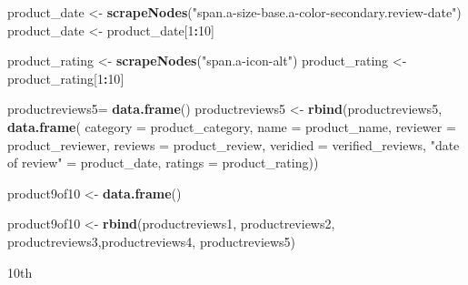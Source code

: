 \documentclass[
]{article}
\newenvironment{Shaded}{\begin{snugshade}}{\end{snugshade}}
\newcommand{\AttributeTok}[1]{\textcolor[rgb]{0.13,0.29,0.53}{#1}}
\newcommand{\DecValTok}[1]{\textcolor[rgb]{0.00,0.00,0.81}{#1}}
\newcommand{\FunctionTok}[1]{\textcolor[rgb]{0.13,0.29,0.53}{\textbf{#1}}}
\newcommand{\NormalTok}[1]{#1}
\newcommand{\OtherTok}[1]{\textcolor[rgb]{0.56,0.35,0.01}{#1}}
\newcommand{\SpecialCharTok}[1]{\textcolor[rgb]{0.81,0.36,0.00}{\textbf{#1}}}
\newcommand{\StringTok}[1]{\textcolor[rgb]{0.31,0.60,0.02}{#1}}
\begin{document}
\begin{Shaded}
\begin{Highlighting}[]
\NormalTok{  product\_date }\OtherTok{\textless{}{-}} \FunctionTok{scrapeNodes}\NormalTok{(}\StringTok{"span.a{-}size{-}base.a{-}color{-}secondary.review{-}date"}\NormalTok{)}
\NormalTok{  product\_date }\OtherTok{\textless{}{-}}\NormalTok{ product\_date[}\DecValTok{1}\SpecialCharTok{:}\DecValTok{10}\NormalTok{]}
  
\NormalTok{  product\_rating }\OtherTok{\textless{}{-}} \FunctionTok{scrapeNodes}\NormalTok{(}\StringTok{"span.a{-}icon{-}alt"}\NormalTok{)}
\NormalTok{  product\_rating }\OtherTok{\textless{}{-}}\NormalTok{ product\_rating[}\DecValTok{1}\SpecialCharTok{:}\DecValTok{10}\NormalTok{]}
  
\NormalTok{  productreviews5}\OtherTok{=} \FunctionTok{data.frame}\NormalTok{()}
\NormalTok{  productreviews5 }\OtherTok{\textless{}{-}} \FunctionTok{rbind}\NormalTok{(productreviews5, }\FunctionTok{data.frame}\NormalTok{(}
                      \AttributeTok{category =}\NormalTok{ product\_category,}
                      \AttributeTok{name =}\NormalTok{ product\_name,}
                      \AttributeTok{reviewer =}\NormalTok{ product\_reviewer,}
                      \AttributeTok{reviews =}\NormalTok{ product\_review,}
                      \AttributeTok{veridied =}\NormalTok{ verified\_reviews,}
                      \StringTok{"date of review"} \OtherTok{=}\NormalTok{ product\_date,}
                      \AttributeTok{ratings =}\NormalTok{ product\_rating))}
  
  
\NormalTok{  product9of10 }\OtherTok{\textless{}{-}} \FunctionTok{data.frame}\NormalTok{()}
  
\NormalTok{  product9of10 }\OtherTok{\textless{}{-}} \FunctionTok{rbind}\NormalTok{(productreviews1, productreviews2, productreviews3,productreviews4, productreviews5)}
\end{Highlighting}
\end{Shaded}

10th
\end{document}
